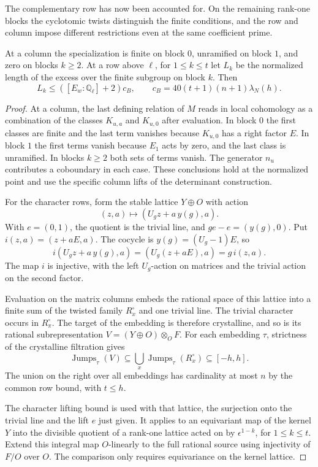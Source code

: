 The complementary row has now been accounted for. On the remaining rank-one blocks the cyclotomic twists distinguish the finite conditions, and the row and column impose different restrictions even at the same coefficient prime.

\begin{proposition}
At a column the specialization is finite on block \(0\),
unramified on block \(1\), and zero on blocks \(k\ge2\).
At a row above \(\ell\), for \(1\le k\le t\) let \(L_k\) be the normalized length of the excess over the finite subgroup on block \(k\). Then
\[
 L_k\le([E_w:\mathbb Q_\ell]+2)c_B,\qquad c_B=40(t+1)(n+1)\lambda_N(h).
\]
\end{proposition}
\begin{proof}
At a column, the last defining relation of \(M\) reads in local
cohomology as a combination of the classes \(K_{u,a}\) and
\(K_{u,0}\) after evaluation. In block \(0\) the first classes
are finite and the last term vanishes because \(K_{u,0}\) has a
right factor \(E\). In block \(1\) the first terms vanish because
\(E_1\) acts by zero, and the last class is unramified. In
blocks \(k\ge2\) both sets of terms vanish. The generator
\(n_u\) contributes a coboundary in each case. These conclusions
hold at the normalized point and use the specific column lifts
of the determinant construction.

For the character rows, form the stable lattice \(Y\oplus O\)
with action
\[
  (z,a)\longmapsto (U_g z+a\,y(g),a).
\]
With \(e=(0,1)\), the quotient is the trivial line, and
\(ge-e=(y(g),0)\). Put \(i(z,a)=(z+aE,a)\).
The cocycle is \(y(g)=(U_g-1)E\), so
\[
    i(U_g z+a\,y(g),a)=(U_g(z+aE),a)=g\,i(z,a).
\]
The map \(i\) is injective, with the left \(U_g\)-action
on matrices and the trivial action on the second factor.

Evaluation
on the matrix columns embeds the rational space of this lattice
into a finite sum of the twisted family \(R_x^\circ\) and one
trivial line. The trivial character occurs in \(R_\pi^\circ\). The target of
the embedding is therefore crystalline, and so is its rational
subrepresentation \(V=(Y\oplus O)\otimes_O F\). For each
embedding \(\tau\), strictness of the crystalline filtration gives
\[
 \operatorname{Jumps}_\tau(V)
     \subseteq \bigcup_x \operatorname{Jumps}_\tau(R_x^\circ)
     \subseteq [-h,h].
\]
The union on the right over all embeddings has cardinality at
most \(n\) by the common row bound, with \(t\le h\).

The character lifting bound is used with that lattice, the
surjection onto the trivial line and the lift \(e\) just given.
It applies to an equivariant map of the kernel \(Y\) into the
divisible quotient of a rank-one lattice acted on by
\(\epsilon^{1-k}\), for \(1\le k\le t\). Extend this integral
map \(O\)-linearly to the full rational source using injectivity
of \(F/O\) over \(O\). The comparison only requires equivariance
on the kernel lattice.


\end{proof}

